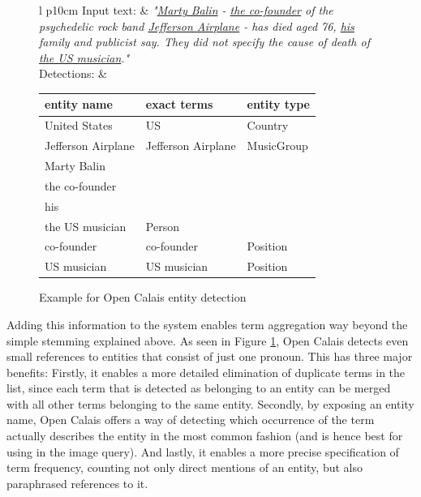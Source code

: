 \documentclass[11pt,a4paper,twoside]{article}
\begin{document}
\begin{figure}[ht]
    \caption{Example for Open Calais entity detection \bigskip}
    \centering
    \begin{tabular}{l p{10cm}}
        Input text: & \nohyphens{\emph{"\underline{Marty Balin} - \underline{the co-founder} of the psychedelic rock band \underline{Jefferson Airplane} - has died aged 76, \underline{his} family and publicist say. They did not specify the cause of death of \underline{the US musician}."}} \bigskip \\
        
        Detections: & \begin{tabular}{|l|l|l|}
         \hline
         \textbf{entity name} & \textbf{exact terms}        & \textbf{entity type}       \\
         \hline
         United States      & US                            & Country           \\
         \hline
         Jefferson Airplane & Jefferson Airplane            & MusicGroup        \\
         \hline
         Marty Balin        & \pbox{50cm}{\vspace{.2\baselineskip}Marty Balin\\the co-founder\\his\\the US musician\vspace{.3\baselineskip}} & Person            \\
         \hline
         co-founder & co-founder & Position \\
         \hline
         US musician & US musician & Position \\
         \hline
    \end{tabular}
    \end{tabular}
    \label{table:calais-example}
\end{figure}

Adding this information to the system enables term aggregation way beyond the simple stemming explained above. As seen in Figure \ref{table:calais-example}, Open Calais detects even small references to entities that consist of just one pronoun. This has three major benefits: Firstly, it enables a more detailed elimination of duplicate terms in the list, since each term that is detected as belonging to an entity can be merged with all other terms belonging to the same entity. Secondly, by exposing an entity name, Open Calais offers a way of detecting which occurrence of the term actually describes the entity in the most common fashion (and is hence best for using in the image query). And lastly, it enables a more precise specification of term frequency, counting not only direct mentions of an entity, but also paraphrased references to it.
\end{document}

